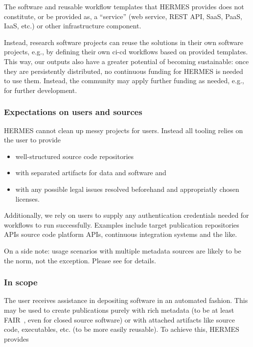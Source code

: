 \documentclass[11pt,a4paper]{scrartcl}
\begin{document}
The software and reusable workflow templates that HERMES provides does not constitute, or be provided as, a \enquote{service}
(web service, REST API, SaaS, PaaS, IaaS, etc.) or other infrastructure component.

Instead, research software projects can reuse the solutions in their own software projects, e.g., by defining their own \gls{ci-cd}
workflows based on provided templates. This way, our outputs also have a greater potential of becoming sustainable: once they are
persistently distributed, no continuous funding for HERMES is needed to use them. Instead, the community may apply further funding
as needed, e.g., for further development.

\subsubsection{Expectations on users and sources}\label{subsubsec:concept-scope-expect}
HERMES cannot clean up messy projects for users. Instead all tooling relies on the user to provide

\begin{itemize}  
    \item well-structured source code repositories
    \item with separated artifacts for data and software and
    \item with any possible legal issues resolved beforehand and appropriatly chosen licenses.
\end{itemize}

Additionally, we rely on users to supply any authentication credentials needed for workflows to run successfully. 
Examples include target publication repositories APIs source code platform APIs, continuous integration systems and the like. 

On a side note: usage scenarios with multiple metadata sources are likely to be the norm, not the exception. Please see  for details.

\subsubsection{In scope}\label{subsubsec:concept-scope-in}
The user receives assistance in depositing software in an automated fashion. This may be used to create publications purely with 
rich metadata (to be at least FAIR~\cite{FAIR4RS-Principles}, even for closed source software) or with attached artifacts like 
source code, executables, etc. (to be more easily reusable). To achieve this, HERMES provides
\end{document}

